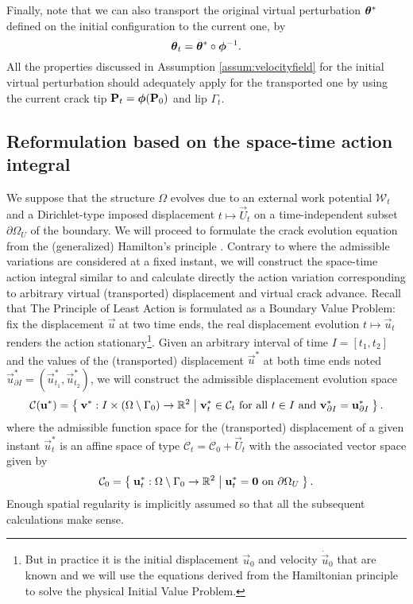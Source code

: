 Finally, note that we can also transport the original virtual perturbation $\vtheta^*$ defined on the initial configuration to the current one, by
\[
\vtheta_t=\vtheta^*\circ\philt^{-1}.
\]
All the properties discussed in Assumption \ref{assum:velocityfield} for the initial virtual perturbation should adequately apply for the transported one by using the current crack tip $\vec{P}_t=\philt(\vec{P}_0)$ and lip $\Gamma_t$.

\subsection{Reformulation based on the space-time action integral} \label{sec:reformulationtheta}
We suppose that the structure $\Omega$ evolves due to an external work potential $\mathcal{W}_t$ and a Dirichlet-type imposed displacement $t\mapsto\vec{U}_t$ on a time-independent subset $\partial\Omega_U$ of the boundary. We will proceed to formulate the crack evolution equation from the (generalized) Hamilton's principle \cite{Hamilton:1834}. Contrary to \cite{Oleaga:2001} where the admissible variations are considered at a fixed instant, we will construct the space-time action integral similar to \cite{Adda-BediaAriasAmarLund:1999} and calculate directly the action variation corresponding to arbitrary virtual (transported) displacement and virtual crack advance. Recall that The Principle of Least Action is formulated as a Boundary Value Problem: fix the displacement $\vec{u}$ at two time ends, the real displacement evolution $t\mapsto\vec{u}_t$ renders the action stationary\footnote{But in practice it is the initial displacement $\vec{u}_0$ and velocity $\dot{\vec{u}}_0$ that are known and we will use the equations derived from the Hamiltonian principle to solve the physical Initial Value Problem.}. Given an arbitrary interval of time $I=[t_1,t_2]$ and the values of the (transported) displacement $\vec{u}^*$ at both time ends noted $\vec{u}^*_{\partial I}=(\vec{u}^*_{t_1},\vec{u}^*_{t_2})$, we will construct the admissible displacement evolution space
\begin{equation} \label{eq:Cu}
\mathcal{C}(\vec{u}^*)=\set{\vec{v}^*:I\times(\domaini)\to\mathbb{R}^2|\vec{v}_t^*\in\mathcal{C}_t\text{ for all $t\in I$ and }\vec{v}^*_{\partial I}=\vec{u}^*_{\partial I}}.
\end{equation}
where the admissible function space for the (transported) displacement of a given instant $\vec{u}^*_t$ is an affine space of type $\mathcal{C}_t=\mathcal{C}_0+\vec{U}_t$ with the associated vector space given by
\[
\mathcal{C}_0=\set{\vec{u}^*_t:\domaini\to\mathbb{R}^2|\vec{u}^*_t=\vec{0}\text{ on }\partial\Omega_U}.
\]
Enough spatial regularity is implicitly assumed so that all the subsequent calculations make sense.

